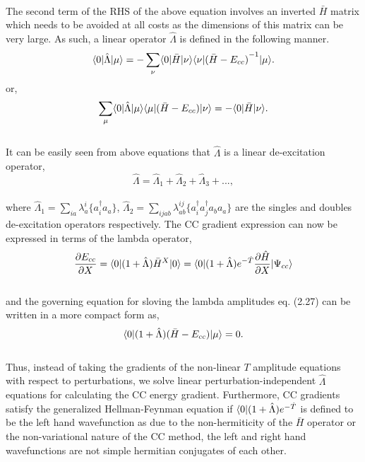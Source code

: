 \\
The second term of the RHS of the above equation involves an inverted 
$\bar{H}$ matrix which needs to be avoided at all costs as the dimensions
of this matrix can be very large. As such, a linear operator $\hat{\Lambda}$
is defined in the following manner.
\\
\begin{equation}
\langle 0 |\hat{\Lambda}| \mu \rangle = -\sum_{\nu}\langle 0 |\bar{H}| \nu \rangle
\langle \nu |{(\bar{H}-E_{cc})}^{-1}| \mu \rangle.
\end{equation}
or, 
\begin{equation}
\sum_{\mu}\langle 0 |\hat{\Lambda}| \mu \rangle\langle \mu |{(\bar{H}-E_{cc})}| \nu \rangle
 = - \langle 0 |\bar{H}| \nu \rangle.
\end{equation}
\\
It can be easily seen from above equations that $\hat{\Lambda}$ is a linear de-excitation operator,
\begin{equation}
\hat{\Lambda} = \hat{\Lambda}_1 + \hat{\Lambda}_2 + \hat{\Lambda}_3 + ...,
\end{equation} 
\\
where $\hat{\Lambda}_1 = \sum\limits_{ia}\lambda^i_a\{{a}^\dagger_i a_a\}$, $\hat{\Lambda}_2=\sum\limits_{ijab}
\lambda^{ij}_{ab}\{{a}^\dagger_i {a}^\dagger_j a_b a_a\}$ 
are the singles and doubles de-excitation operators respectively. The CC gradient expression can now be expressed 
in terms of the lambda operator,
\\
\begin{equation}
\frac{\partial{E_{cc}}}{\partial X} = \langle 0 |(1 + \hat{\Lambda}){\bar{H}}^X| 0 \rangle = \langle 0 |(1 + \hat{\Lambda})e^{-\hat{T}}\frac{\partial{\hat H}}{\partial X}| \Psi_{cc} \rangle
\end{equation}
\\
and the governing equation for sloving the lambda amplitudes eq. (2.27) can be written in a more compact form as,
\\
\begin{equation}
\langle 0 |(1 + \hat{\Lambda})(\bar{H} - E_{cc})| \mu \rangle = 0.
\end{equation}
\\
Thus, instead of taking the gradients of the non-linear $T$ amplitude
equations with respect to perturbations, we solve linear perturbation-independent 
$\hat{\Lambda}$ equations for calculating the CC energy gradient.
Furthermore, CC gradients satisfy the generalized Hellman-Feynman equation\cite{Feynman39}
if $\langle 0 |(1 + \hat{\Lambda})e^{-\hat{T}}$ is defined to be the left hand wavefunction
as due to the non-hermiticity of the $\bar{H}$ operator or the non-variational nature of the 
CC method, the left and right hand wavefunctions are not simple hermitian conjugates of each other.

